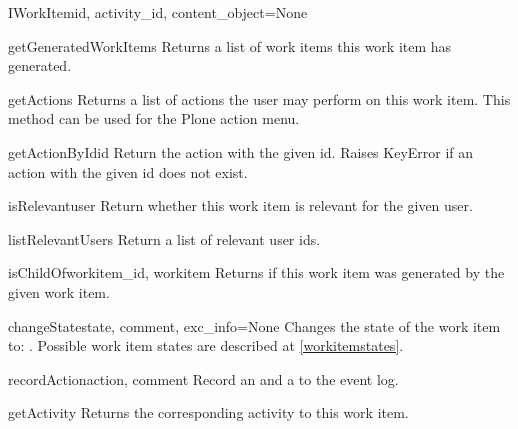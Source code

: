     \begin{classdesc}{IWorkItem}{id, activity_id, content_object=None}

      \begin{funcdesc}{getGeneratedWorkItems}{}
          Returns a list of work items this work item has generated.
      \end{funcdesc}

      \begin{funcdesc}{getActions}{}
          Returns a list of actions the user may perform on this work 
          item. This method can be used for the Plone action menu.
      \end{funcdesc}

      \begin{funcdesc}{getActionById}{id}
          Return the action with the given id.
          Raises KeyError if an action with the given id does not exist.
      \end{funcdesc}

      \begin{funcdesc}{isRelevant}{user}
          Return whether this work item is relevant for the given user.
      \end{funcdesc}

      
      \begin{funcdesc}{listRelevantUsers}{}
          Return a list of relevant user ids.
      \end{funcdesc}

      \begin{funcdesc}{isChildOf}{workitem_id, workitem}
        Returns  if this work item was generated by the given work item.
      \end{funcdesc}
      
      \begin{funcdesc}{changeState}{state, comment, exc_info=None}
          Changes the state of the work item to: . Possible 
          work item states are described at \ref{workitemstates}.
      \end{funcdesc}

      \begin{funcdesc}{recordAction}{action, comment}
          Record an  and a  to the event log.
      \end{funcdesc}
      
      \begin{funcdesc}{getActivity}{}
          Returns the corresponding activity to this work item.
      \end{funcdesc}


\end{classdesc}
